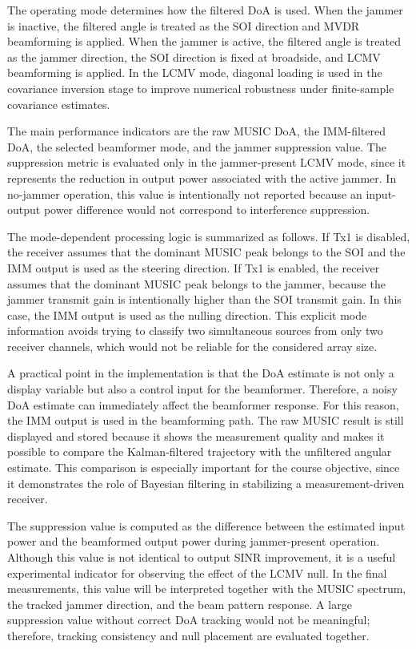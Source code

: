 \documentclass[conference]{IEEEtran}
\begin{document}
The operating mode determines how the filtered DoA is used. When the jammer is inactive, the filtered angle is treated as the SOI direction and MVDR beamforming is applied. When the jammer is active, the filtered angle is treated as the jammer direction, the SOI direction is fixed at broadside, and LCMV beamforming is applied. In the LCMV mode, diagonal loading is used in the covariance inversion stage to improve numerical robustness under finite-sample covariance estimates.

The main performance indicators are the raw MUSIC DoA, the IMM-filtered DoA, the selected beamformer mode, and the jammer suppression value. The suppression metric is evaluated only in the jammer-present LCMV mode, since it represents the reduction in output power associated with the active jammer. In no-jammer operation, this value is intentionally not reported because an input-output power difference would not correspond to interference suppression.


The mode-dependent processing logic is summarized as follows. If Tx1 is disabled, the receiver assumes that the dominant MUSIC peak belongs to the SOI and the IMM output is used as the steering direction. If Tx1 is enabled, the receiver assumes that the dominant MUSIC peak belongs to the jammer, because the jammer transmit gain is intentionally higher than the SOI transmit gain. In this case, the IMM output is used as the nulling direction. This explicit mode information avoids trying to classify two simultaneous sources from only two receiver channels, which would not be reliable for the considered array size.

A practical point in the implementation is that the DoA estimate is not only a display variable but also a control input for the beamformer. Therefore, a noisy DoA estimate can immediately affect the beamformer response. For this reason, the IMM output is used in the beamforming path. The raw MUSIC result is still displayed and stored because it shows the measurement quality and makes it possible to compare the Kalman-filtered trajectory with the unfiltered angular estimate. This comparison is especially important for the course objective, since it demonstrates the role of Bayesian filtering in stabilizing a measurement-driven receiver.

The suppression value is computed as the difference between the estimated input power and the beamformed output power during jammer-present operation. Although this value is not identical to output SINR improvement, it is a useful experimental indicator for observing the effect of the LCMV null. In the final measurements, this value will be interpreted together with the MUSIC spectrum, the tracked jammer direction, and the beam pattern response. A large suppression value without correct DoA tracking would not be meaningful; therefore, tracking consistency and null placement are evaluated together.
\end{document}
